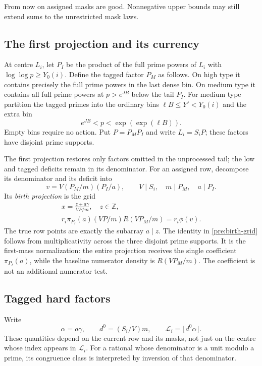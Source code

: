 From now on assigned masks are good. Nonnegative upper bounds may
still extend sums to the unrestricted mask laws.

\subsection{The first projection and its currency}

At centre $L_i$, let $P_I$ be the product of the full prime powers
of $L_i$ with $\log\log p\ge Y_0(i)$. Define the tagged factor
$P_M$ as follows. On high type it contains precisely the full prime
powers in the last dense bin. On medium type it contains all full
prime powers at $p>e^{JB}$ below the tail $P_I$. For medium type
partition the tagged primes into the ordinary bins
$\ell B\le Y'<Y_0(i)$ and the extra bin
\[
 e^{JB}<p<\exp(\exp(\ell B)).
\]
Empty bins require no action. Put $P=P_MP_I$ and write $L_i=S_iP$;
these factors have disjoint prime supports.

The first projection restores only factors omitted in the unprocessed
tail; the low and tagged deficits remain in its denominator.
For an assigned row, decompose its denominator and its deficit into
\[
 v=V(P_M/m)(P_I/a),\qquad
 V\mid S_i,\quad m\mid P_M,\quad a\mid P_I.
\]
Its \emph{birth projection} is the grid
\begin{equation}
 \begin{gathered}
 x=\frac{z+a\gamma}{VP/m},\quad z\in\mathbb Z,
 \\
 r_i\pi_{P_I}(a)(VP/m)R(VP_M/m)=r_i\phi(v).
 \end{gathered}
 \label{pre:birth-grid}
\end{equation}
The true row points are exactly the subarray $a\mid z$. The identity
in \eqref{pre:birth-grid} follows from multiplicativity across the
three disjoint prime supports. It is the first-mass normalization:
the entire projection receives the single coefficient
$\pi_{P_I}(a)$, while the baseline numerator density is
$R(VP_M/m)$. The coefficient is not an additional numerator test.

\subsection{Tagged hard factors}

Write
\[
 \alpha=a\gamma,\qquad d^0=(S_i/V)m,\qquad
 \mathcal L_i=\lfloor d^0\alpha\rfloor.
\]
These quantities depend on the current row and its masks, not just
on the centre whose index appears in $\mathcal L_i$.
For a rational whose denominator is a unit modulo a prime, its
congruence class is interpreted by inversion of that denominator.

